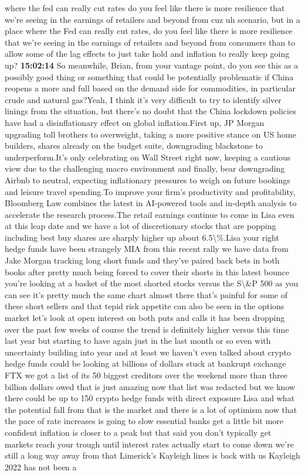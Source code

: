 \documentclass{article}%
\begin{document}
where the fed can really cut rates do you feel like there is more resilience that we're seeing in the earnings of retailers and beyond from cuz uh  scenario, but in a place where the Fed can really cut rates, do you feel like there is more resilience that we're seeing in the earnings of retailers and beyond from consumers than to allow some of the lag effects to just take hold and inflation to really keep going up?%
\textbf{15:02:14}%
\newline%
So meanwhile, Brian, from your vantage point, do you see this as a possibly good thing or something that could be potentially problematic if China reopens a more and full based on the demand side for commodities, in particular crude and natural gas?Yeah, I think it's very difficult to try to identify silver linings from the situation, but there's no doubt that the China lockdown policies have had a disinflationary effect on global inflation.First up, JP Morgan upgrading toll brothers to overweight, taking a more positive stance on US home builders, shares already on the budget suite, downgrading blackstone to underperform.It's only celebrating on Wall Street right now, keeping a cautious view due to the challenging macro environment and finally, bear downgrading Airbnb to neutral, expecting inflationary pressures to weigh on future bookings and leisure travel spending.To improve your firm's productivity and profitability, Bloomberg Law combines the latest in AI{-}powered tools and in{-}depth analysis to accelerate the research process.The retail earnings continue to come in Lisa even at this leap date and we have a lot of discretionary stocks that are popping including best buy shares are sharply higher up about 6.5\textbackslash{}\%.Lisa your right hedge funds have been strangely MIA from this recent rally we have data from Jake Morgan tracking long short funds and they've paired back bets in both books after pretty much being forced to cover their shorts in this latest bounce you're looking at a basket of the most shorted stocks versus the S\textbackslash{}\&P 500 as you can see it's pretty much the same chart almost there that's painful for some of these short sellers and that tepid risk appetite can also be seen in the options market let's look at open interest on both puts and calls it has been dropping over the past few weeks of course the trend is definitely higher versus this time last year but starting to have again just in the last month or so even with uncertainty building into year and at least we haven't even talked about crypto hedge funds could be looking at billions of dollars stuck at bankrupt exchange FTX we got a list of its 50 biggest creditors over the weekend more than three billion dollars owed that is just amazing now that list was redacted but we know there could be up to 150 crypto hedge funds with direct exposure Lisa and what the potential fall from that is the market and there is a lot of optimism now that the pace of rate increases is going to slow essential banks get a little bit more confident inflation is closer to a peak but that said you don't typically get markets reach your trough until interest rates actually start to come down we're still a long way away from that Limerick's Kayleigh lines is back with us Kayleigh 2022 has not been a 
\end{document}
